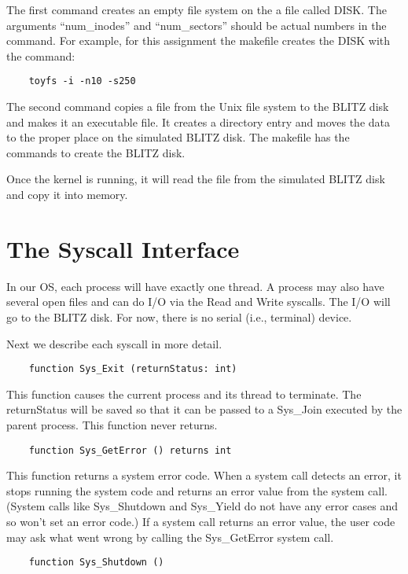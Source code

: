 \documentclass[12pt]{article}
\begin{document}
The first command creates an empty file system on the a file called
DISK.  The arguments ``num\_inodes'' and ``num\_sectors'' should be
actual numbers in the command.  For example, for this assignment the
makefile creates the DISK with the command:
\begin{verbatim}
    toyfs -i -n10 -s250
\end{verbatim}

The second command copies a file from the Unix file system to the
BLITZ disk and makes it an executable file.  It creates a directory
entry and moves the data to the proper place on the simulated BLITZ
disk.  The makefile has the commands to create the BLITZ disk.

Once the kernel is running, it will read the file from the simulated
BLITZ disk and copy it into memory.


\section{The Syscall Interface}

In our OS, each process will have exactly one thread.  A process may
also have several open files and can do I/O via the Read and Write
syscalls.  The I/O will go to the BLITZ disk.  For now, there is no
serial (i.e., terminal) device.

Next we describe each syscall in more detail.

\begin{verbatim}
    function Sys_Exit (returnStatus: int)
\end{verbatim}

This function causes the current process and its thread to terminate.
The returnStatus will be saved so that it can be passed to a Sys\_Join
executed by the parent process.  This function never returns.

\begin{verbatim}
    function Sys_GetError () returns int
\end{verbatim}

This function returns a system error code.  When a system call
detects an error, it stops running the system code and returns
an error value from the system call.  (System calls like
Sys\_Shutdown and Sys\_Yield do not have any error cases and
so won't set an error code.)   If a system call returns an
error value, the user code may ask what went wrong by calling
the Sys\_GetError system call.

\begin{verbatim}
    function Sys_Shutdown ()
\end{verbatim}
\end{document}
